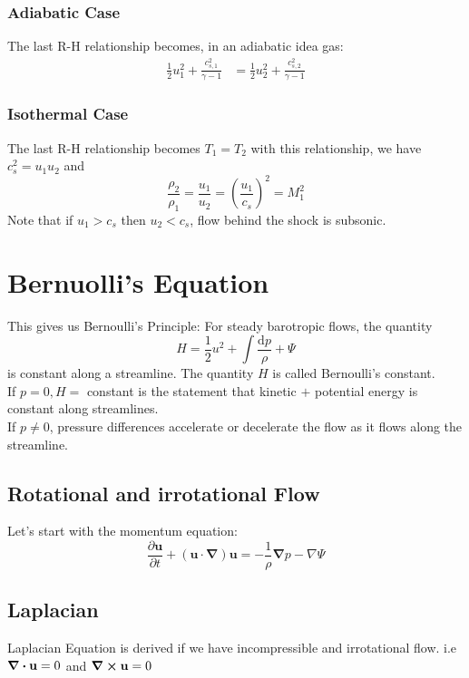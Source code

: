 \documentclass[12pt,a4paper]{article}
\begin{document}
    \subsubsection{Adiabatic Case}
    The last R-H relationship becomes, in an adiabatic idea gas:
    \begin{align*}
        \frac{1}{2} u_1^2+\frac{c_{s, 1}^2}{\gamma-1}&=\frac{1}{2} u_2^2+\frac{c_{s, 2}^2}{\gamma-1}
    \end{align*}

    \subsubsection{Isothermal Case}
    The last R-H relationship becomes $T_1=T_2$
    with this relationship, we have $c_s^2=u_1u_2$ and 
    $$ 
    \frac{\rho_2}{\rho_1}=\frac{u_1}{u_2}=\left(\frac{u_1}{c_s}\right)^2=M_1^2
    $$
    Note that if $u_1>c_s$ then $u_2<c_s$, flow behind the shock is subsonic.

\section{Bernuolli's Equation}
This gives us Bernoulli's Principle: For steady barotropic flows, the quantity
$$
H=\frac{1}{2} u^2+\int \frac{\mathrm{d} p}{\rho}+\Psi
$$
is constant along a streamline. The quantity $H$ is called Bernoulli's constant.\\
If $p=0, H=$ constant is the statement that kinetic $+$ potential energy is constant along streamlines.\\

If $p \neq 0$, pressure differences accelerate or decelerate the flow as it flows along the streamline.
\subsection{Rotational and irrotational Flow}
Let's start with the momentum equation:
$$
\frac{\partial \mathbf{u}}{\partial t}+(\mathbf{u} \cdot \boldsymbol{\nabla}) \mathbf{u}=-\frac{1}{\rho} \boldsymbol{\nabla} p-\nabla \Psi
$$


\subsection{Laplacian}
Laplacian Equation is derived if we have incompressible and irrotational flow. i.e $\div{\vb{u}=0}$ and $\curl{\vb{u}}=0$
\end{document}
